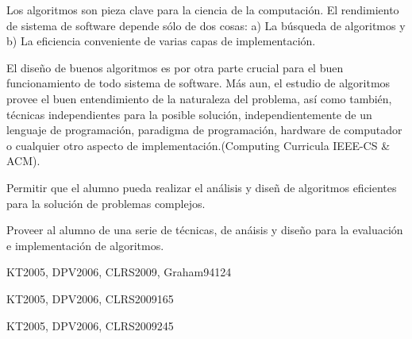 \begin{syllabus}


\begin{justification}
Los algoritmos son pieza clave para la ciencia de la computación. 
El rendimiento de sistema de software
depende sólo de dos cosas: a) La búsqueda de  algoritmos y b) La
eficiencia conveniente de varias capas de implementación.

El diseño de buenos algoritmos es por otra parte crucial para el
buen funcionamiento de todo sistema de software. Más aun, el
estudio  de algoritmos provee el buen entendimiento de la
naturaleza  del problema, así como también, técnicas
independientes para la posible solución, independientemente de un
lenguaje de programación, paradigma de programación, hardware de
computador o cualquier otro aspecto de implementación.(Computing
Curricula IEEE-CS \& ACM).
\end{justification}

\begin{goals}
 \item Permitir que el alumno pueda realizar el análisis y diseñ
de algoritmos eficientes para la solución de problemas complejos.

 \item Proveer al alumno de una serie de técnicas, de anáisis y
diseño para la evaluación e implementación de algoritmos.
\end{goals}

\begin{outcomes}
\end{outcomes}

\begin{unit}{\ALBasicAnalysisDef}{KT2005, DPV2006, CLRS2009, Graham94}{12}{4}
    \ALBasicAnalysisAllTopics
    \ALBasicAnalysisAllObjectives
\end{unit}

\begin{unit}{\ALFundamentalAlgorithmsDef}{KT2005, DPV2006, CLRS2009}{16}{5}
    \ALFundamentalAlgorithmsAllTopics
    \ALFundamentalAlgorithmsAllObjectives
\end{unit}

\begin{unit}{\ALAlgoritmicStrategiesDef}{KT2005, DPV2006, CLRS2009}{24}{5}
   \ALAlgoritmicStrategiesAllTopics
   \ALAlgoritmicStrategiesAllObjectives
\end{unit}


\end{syllabus}
